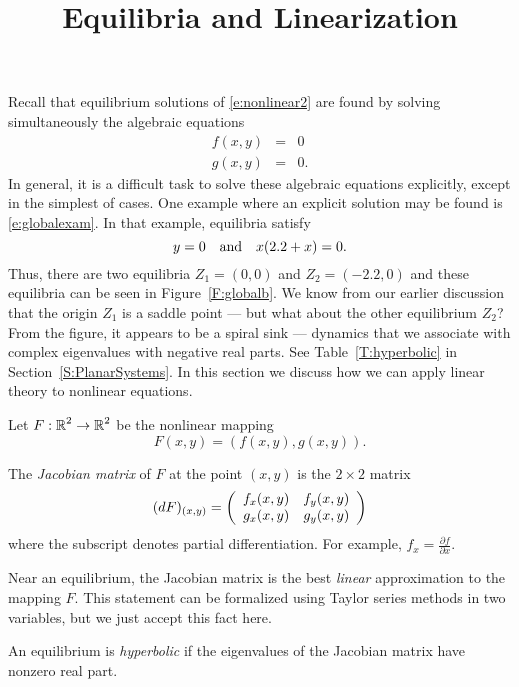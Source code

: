 \documentclass{ximera}
\title{Equilibria and Linearization}
\begin{document}
\begin{abstract}
\end{abstract}
\maketitle

 \label{S:linearization}
  

Recall that equilibrium solutions of \eqref{e:nonlinear2}
are found by solving simultaneously the algebraic equations
\begin{equation}
\begin{array}{rcl} 
f(x,y) & = & 0 \\
g(x,y) & = & 0.
\end{array}
\end{equation}
In general, it is a difficult task to solve these algebraic
equations explicitly, except in the simplest of cases. One
example where an explicit solution may be found is
\eqref{e:globalexam}.  In that example, equilibria satisfy
\[
y  =  0 \quad\mbox{and}\quad x(2.2+x) = 0.
\]
Thus, there are two equilibria $Z_1=(0,0)$ and $Z_2=(-2.2,0)$
and these equilibria can be seen in Figure~\ref{F:globalb}.  We
know from our earlier discussion that the origin $Z_1$ is a
saddle point --- but what about the other equilibrium $Z_2$?
From the figure, it appears to be a spiral sink --- dynamics
that we associate with complex eigenvalues with negative real
parts.  See Table~\ref{T:hyperbolic} in Section~\ref{S:PlanarSystems}.  
In this section we discuss how we can apply linear theory to 
nonlinear equations. 

Let $F:\mbox{$\Bbb{R}$}^2\to\mbox{$\Bbb{R}$}^2$ be the nonlinear mapping 
\[
F(x,y)=(f(x,y),g(x,y)).
\]
\begin{definition}  \label{D:Jacobian}
The {\em Jacobian matrix} 
 of $F$ at the point 
$(x,y)$ is the $2\times 2$ matrix 
\begin{equation}  \label{e:jacobian}
(dF)_{(x,y)} = \left(\begin{array}{rr} f_x(x,y) & f_y(x,y)\\ g_x(x,y) &g_y(x,y)\end{array}\right)
\end{equation}
where the subscript denotes partial differentiation.  For example, 
$f_x=\frac{\partial f}{\partial x}$.
\end{definition}

Near an equilibrium, the Jacobian matrix is the best {\em linear\/}
approximation to the mapping $F$.  
This statement can be formalized using 
Taylor series methods in two variables, but we just accept this fact here. 
\begin{definition}  \label{D:hyperbolic}
An equilibrium is {\em hyperbolic\/} if the eigenvalues of the 
Jacobian matrix have nonzero real part. 
\end{definition} 
\end{document}
